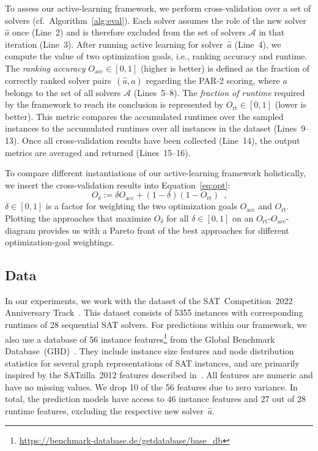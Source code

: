 \documentclass[sn-basic, Numbered]{sn-jnl} %
\begin{document}
To assess our active-learning framework, we perform cross-validation over a set of solvers (cf.~Algorithm~\ref{alg:eval}).
Each solver assumes the role of the new solver~$\hat{a}$ once (Line~2) and is therefore excluded from the set of solvers $\mathcal{A}$ in that iteration (Line~3).
After running active learning for solver~$\hat{a}$ (Line~4), we compute the value of two optimization goals, i.e., ranking accuracy and runtime.
The \emph{ranking accuracy} $O_{\operatorname{acc}} \in \left[0, 1\right]$ (higher is better) is defined as the fraction of correctly ranked solver pairs~$\left(\hat{a}, a\right)$ regarding the PAR-2 scoring, where $a$ belongs to the set of all solvers $\mathcal{A}$ (Lines~5--8).
The \emph{fraction of runtime} required by the framework to reach its conclusion is represented by $O_{\operatorname{rt}} \in [0, 1]$ (lower is better).
This metric compares the accumulated runtimes over the sampled instances to the accumulated runtimes over all instances in the dataset (Lines~9--13).
Once all cross-validation results have been collected (Line~14), the output metrics are averaged and returned (Lines~15--16).

To compare different instantiations of our active-learning framework holistically, we insert the cross-validation results into Equation~\eqref{eq:opt}:
%
\begin{equation}
	O_\delta := \delta O_{\operatorname{acc}} + \left(1 - \delta\right) \left(1 - O_{\operatorname{rt}}\right) \enspace \textrm{,}
	\label{eq:opt}
\end{equation} 
%
$\delta \in \left[0, 1\right]$ is a factor for weighting the two optimization goals $O_{\operatorname{acc}}$ and $O_{\operatorname{rt}}$.
Plotting the approaches that maximize $O_\delta$ for all $\delta \in \left[0, 1\right]$ on an $O_{\operatorname{rt}}$-$O_{\operatorname{acc}}$-diagram provides us with a Pareto front of the best approaches for different optimization-goal weightings.

\subsection{Data}
\label{sec:exdesign:data}

In our experiments, we work with the dataset of the SAT~Competition~2022 Anniversary Track~\cite{sat2022,zenodoanniversarytrack}.
This dataset consists of 5355 instances with corresponding runtimes of 28 sequential SAT solvers.
For predictions within our framework, we also use a database of 56 instance features\footnote{\url{https://benchmark-database.de/getdatabase/base_db}} from the Global Benchmark Database~(GBD)~\cite{GBD24paper}.
They include instance size features and node distribution statistics for several graph representations of SAT instances, and are primarily inspired by the SATzilla~2012 features described in~\cite{features}.
All features are numeric and have no missing values.
We drop 10 of the 56 features due to zero variance.
In total, the prediction models have access to 46 instance features and 27 out of 28 runtime features, excluding the respective new solver~$\hat{a}$.
\end{document}
